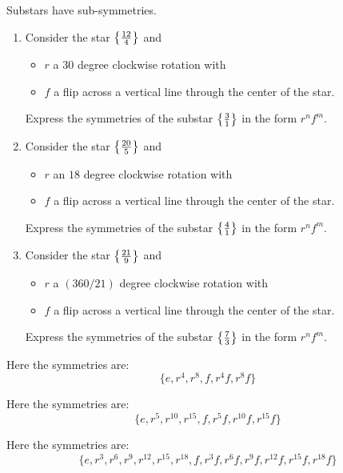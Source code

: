 \documentclass[noauthor,nooutcomes,12pt,hints,handout]{ximera}
\begin{document}
\begin{question}
  Substars have sub-symmetries.
  \begin{enumerate}
  \item Consider the star $\left\{\frac{12}{4}\right\}$ and
    \begin{itemize}
    \item $r$ a $30$ degree clockwise rotation with
    \item $f$ a flip across a vertical line through the center of the
      star.
    \end{itemize}
    Express the symmetries of the substar $\left\{\frac{3}{1}\right\}$ in the
    form $r^n f^m$.
  \item Consider the star $\left\{\frac{20}{5}\right\}$ and
    \begin{itemize}
    \item $r$ an $18$ degree clockwise rotation with
    \item $f$ a flip across a vertical line through the center of
      the star.
    \end{itemize}
    Express the symmetries of the substar $\left\{\frac{4}{1}\right\}$ in the
    form $r^n f^m$.
  \item Consider the star $\left\{\frac{21}{9}\right\}$ and
    \begin{itemize}
    \item $r$ a $(360/21)$ degree clockwise rotation with
    \item $f$ a flip across a vertical line through the center of the
      star.
    \end{itemize}
    Express the symmetries of the substar $\left\{\frac{7}{3}\right\}$ in the
    form $r^n f^m$.
  \end{enumerate}
  \begin{freeResponse}
  \item Here the symmetries are:
    \[
    \{e, r^4,r^8,f,r^4f,r^8f\}
    \]
  \item Here the symmetries are:
    \[
    \{e, r^5,r^{10},r^{15},f,r^5f,r^{10}f,r^{15}f\}
    \]
   \item Here the symmetries are:
    \[
    \{e, r^3,r^{6},r^{9},r^{12},r^{15},r^{18},f, r^3f,r^{6}f,r^{9}f,r^{12}f,r^{15}f,r^{18}f\}
    \]  
  \end{freeResponse}
\end{question}

\mynewpage
\end{document}
